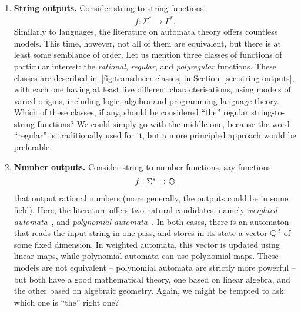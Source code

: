 \begin{enumerate}
    \item \textbf{String outputs.}
Consider string-to-string functions 
\begin{align*}
f : \Sigma^* \to \Gamma^*.
\end{align*}
Similarly to languages, the literature on automata theory offers countless  models. This time, however, not all of them are equivalent, but there is at least some semblance of order. Let us mention three classes of functions  of particular interest:  the \emph{rational}, \emph{regular}, and \emph{polyregular} functions. These classes are described in~\cref{fig:transducer-classes} in Section~\ref{sec:string-outputs}, with each one having at least five different characterisations, using models of varied origins, including logic, algebra and programming language theory. Which of these classes, if any, should be considered ``the'' regular string-to-string functions? We could simply go with the middle one, because  the word ``regular'' is traditionally used for it, but a more principled approach would be preferable.

\item \textbf{Number outputs.}
Consider string-to-number functions, say functions 
\begin{align*}
f : \Sigma^* \to {\mathbb Q}
\end{align*}
that output rational numbers (more generally, the outputs could be in some field). Here, the literature offers two natural candidates, namely \emph{weighted automata}~\cite{schutzenberger1961definition}, and \emph{polynomial automata}~\cite[Section IV]{DBLP:conf/lics/BenediktDSW17}. In both cases, there is an automaton that reads the input string in one pass, and stores in its state a vector ${\mathbb Q}^d$ of some fixed dimension. In weighted automata, this vector is updated using linear maps, while polynomial automata can use polynomial maps. These models are not equivalent -- polynomial automata are strictly more powerful -- but both have a good mathematical theory, one based on linear algebra, and the other based on algebraic geometry. Again, we might be tempted to ask: which one is ``the'' right one?


\end{enumerate}
